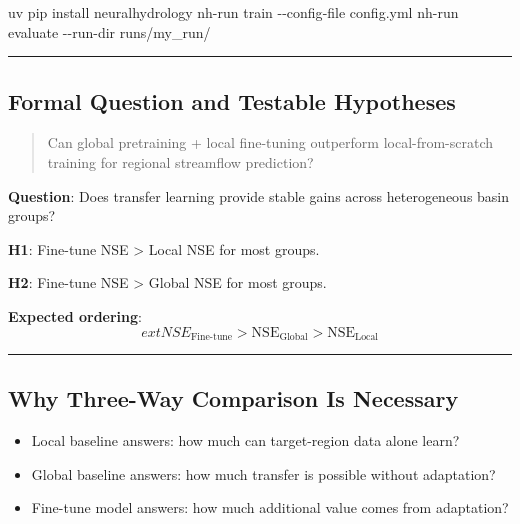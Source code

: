 \documentclass[
  letterpaper,
  DIV=11,
  numbers=noendperiod]{scrartcl}
\newenvironment{Shaded}{\begin{snugshade}}{\end{snugshade}}
\newcommand{\AttributeTok}[1]{\textcolor[rgb]{0.40,0.45,0.13}{#1}}
\newcommand{\ExtensionTok}[1]{\textcolor[rgb]{0.00,0.23,0.31}{#1}}
\newcommand{\NormalTok}[1]{\textcolor[rgb]{0.00,0.23,0.31}{#1}}
\providecommand{\tightlist}{%
  \setlength{\itemsep}{0pt}\setlength{\parskip}{0pt}}
\begin{document}
\begin{Shaded}
\begin{Highlighting}[]
\ExtensionTok{uv}\NormalTok{ pip install neuralhydrology}
\ExtensionTok{nh{-}run}\NormalTok{ train    }\AttributeTok{{-}{-}config{-}file}\NormalTok{ config.yml}
\ExtensionTok{nh{-}run}\NormalTok{ evaluate }\AttributeTok{{-}{-}run{-}dir}\NormalTok{    runs/my\_run/}
\end{Highlighting}
\end{Shaded}

\begin{center}\rule{0.5\linewidth}{0.5pt}\end{center}

\subsection{Formal Question and Testable
Hypotheses}\label{formal-question-and-testable-hypotheses}

\begin{quote}
Can global pretraining + local fine-tuning outperform local-from-scratch
training for regional streamflow prediction?
\end{quote}

\textbf{Question}: Does transfer learning provide stable gains across
heterogeneous basin groups?

\textbf{H1}: Fine-tune NSE \textgreater{} Local NSE for most groups.

\textbf{H2}: Fine-tune NSE \textgreater{} Global NSE for most groups.

\textbf{Expected ordering}: \[
    ext{NSE}_{\text{Fine-tune}} > \text{NSE}_{\text{Global}} > \text{NSE}_{\text{Local}}
\]

\begin{center}\rule{0.5\linewidth}{0.5pt}\end{center}

\subsection{Why Three-Way Comparison Is
Necessary}\label{why-three-way-comparison-is-necessary}

\begin{itemize}
\tightlist
\item
  Local baseline answers: how much can target-region data alone learn?
\item
  Global baseline answers: how much transfer is possible without
  adaptation?
\item
  Fine-tune model answers: how much additional value comes from
  adaptation?
\end{itemize}
\end{document}
